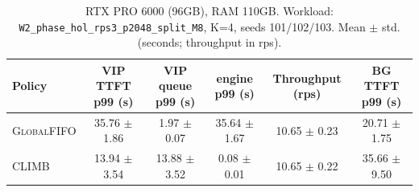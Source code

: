 \begin{table}[t]
\centering
\small
\setlength{\tabcolsep}{4pt}
\caption{RTX PRO 6000 (96GB), RAM 110GB. Workload: \texttt{W2\_phase\_hol\_rps3\_p2048\_split\_M8}, K=4, seeds 101/102/103. Mean $\pm$ std. (seconds; throughput in rps).}
\begin{tabular}{lccccc}
\toprule
Policy & \textsf{VIP} TTFT p99 (s) & \textsf{VIP} queue p99 (s) &  engine p99 (s) & Throughput (rps) & \textsf{BG} TTFT p99 (s) \\
\midrule
\textsc{GlobalFIFO} & 35.76 $\pm$ 1.86 & 1.97 $\pm$ 0.07 & 35.64 $\pm$ 1.67 & 10.65 $\pm$ 0.23 & 20.71 $\pm$ 1.75 \\
\textsc{CLIMB} & 13.94 $\pm$ 3.54 & 13.88 $\pm$ 3.52 & 0.08 $\pm$ 0.01 & 10.65 $\pm$ 0.22 & 35.66 $\pm$ 9.50 \\
\bottomrule
\end{tabular}
\vspace{2pt}
\label{tab:pro6000_k4_m8}
\end{table}
